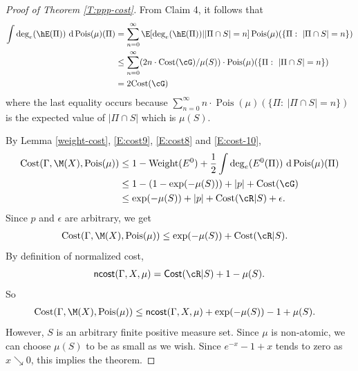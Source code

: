 \documentclass[12pt]{article}
\theoremstyle{plain}
\theoremstyle{definition}
\theoremstyle{remark}
\newcommand{\G}{\Gamma}
\newcommand{\eps}{\epsilon}
\newcommand{\Bern}{\operatorname{Bern}}
\newcommand\cost{{\operatorname{Cost}}}
\newcommand\Pois{\operatorname{Pois}}
\newcommand{\dee}{\textrm{d}}
\begin{document}
\begin{proof}[Proof of Theorem \ref{T:ppp-cost}]
From Claim 4, it follows that
\begin{align}
   \int \deg_e(\hE(\Pi))~\dee \Pois(\mu)(\Pi)&=\sum_{n=0}^\infty  \E[\deg_e(\hE(\Pi))| |\Pi \cap S|=n] \Pois(\mu)(\{\Pi:~ |\Pi \cap S|=n\}) \nonumber\\
   &\le \sum_{n=0}^\infty (2n \cdot \cost(\cG)/\mu(S))\cdot \Pois(\mu)(\{\Pi:~ |\Pi \cap S|=n\})\nonumber \\ &= 2\cost(\cG) \label{E:cost-10}
\end{align}
where the last equality occurs because $\sum_{n=0}^\infty n \cdot \Pois(\mu)(\{\Pi:~ |\Pi \cap S|=n\})$ is the expected value of $|\Pi \cap S|$ which is $\mu(S)$. 



By Lemma \ref{weight-cost}, \eqref{E:cost9}, \eqref{E:cost8} and \eqref{E:cost-10},
\begin{align*}
    \cost(\Gamma, \M(X),\Pois(\mu)) &\le 1- \textrm{Weight}(E^0)+ \frac{1}{2}\int \deg_e(E^0(\Pi))~\dee \Pois(\mu)(\Pi)\\
    &\le 1- (1-\exp(-\mu(S))) + |p| + \cost(\cG) \\
    &\le \exp(-\mu(S)) + |p| + \cost(\cR|S) + \eps.
\end{align*}
Since $p$ and $\eps$ are arbitrary, we get
\begin{align*}
    \cost(\Gamma, \M(X),\Pois(\mu)) 
    &\le \exp(-\mu(S))  + \cost(\cR|S).
\end{align*}
By definition of normalized cost,
$$\mathsf{ncost}(\G,X,\mu) = \mathsf{Cost}(\cR|S)+1-\mu(S).$$
So
\begin{align*}
    \cost(\Gamma, \M(X),\Pois(\mu)) 
    &\le \mathsf{ncost}(\G,X,\mu) + \exp(-\mu(S))   - 1 + \mu(S).
\end{align*}
However, $S$ is an arbitrary finite positive measure set. Since $\mu$ is non-atomic, we can choose $\mu(S)$ to be as small as we wish. Since $e^{-x}-1+x$ tends to zero as $x \searrow 0$, this implies the theorem.
\end{proof}

\end{document}

